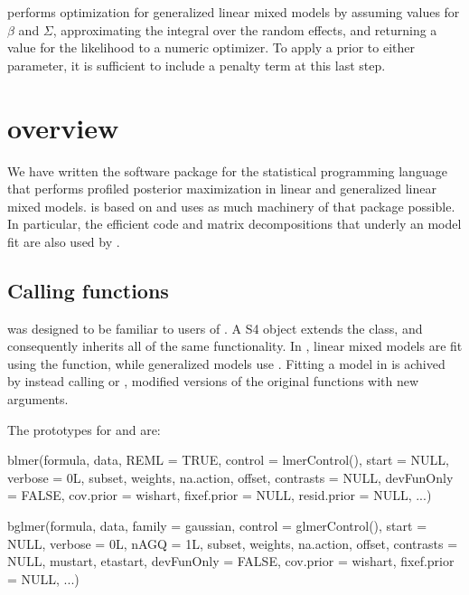 \documentclass[article,shortnames]{jss}
\begin{document}
 performs optimization for generalized linear mixed models
by assuming values for $\beta$ and $\Sigma$, approximating the
integral over the random effects, and returning a value for the
likelihood to a numeric optimizer. To apply a prior to either parameter,
it is sufficient to include a penalty term at this last step.

\section[blme overview]{ overview}

We have written the software package  for the 
statistical programming language that performs profiled posterior
maximization in linear and generalized linear mixed models. 
is based on  and uses as much machinery of that package
possible. In particular, the efficient  code and matrix
decompositions that underly an  model fit are also used by .

\subsection[Calling blme functions]{Calling  functions}

 was designed to be familiar to users of . A
 S4 object extends the  class, and
consequently inherits all of the same functionality. In , linear mixed
models are fit using the  function, while generalized
models use . Fitting a model in  is achived by
instead calling  or , 
modified versions of the original functions with new arguments.

The prototypes for  and  are:

\begin{CodeChunk}
  \begin{Code}
blmer(formula, data, REML = TRUE, control = lmerControl(), start = NULL,
      verbose = 0L, subset, weights, na.action, offset, contrasts = NULL,
      devFunOnly = FALSE, 
      cov.prior = wishart, fixef.prior = NULL, resid.prior = NULL, ...)
  \end{Code}
  \begin{Code}
bglmer(formula, data, family = gaussian, control = glmerControl(),
       start = NULL,  verbose = 0L, nAGQ = 1L, subset, weights, na.action, 
       offset, contrasts = NULL, mustart, etastart, devFunOnly = FALSE, 
       cov.prior = wishart, fixef.prior = NULL, ...)
  \end{Code}
\end{CodeChunk}
\end{document}
